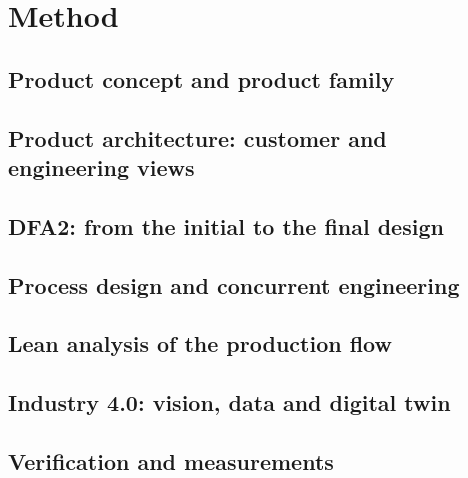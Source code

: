 \section{Method}

\subsection{Product concept and product family}

\subsection{Product architecture: customer and engineering views}

\subsection{DFA2: from the initial to the final design}

\subsection{Process design and concurrent engineering}

\subsection{Lean analysis of the production flow}

\subsection{Industry 4.0: vision, data and digital twin}

\subsection{Verification and measurements}
